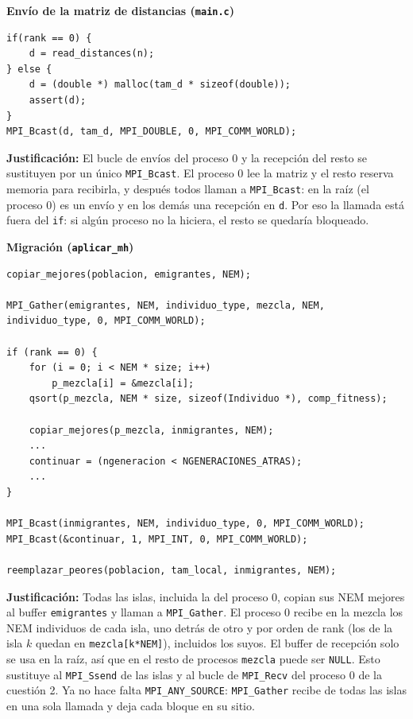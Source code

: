 \documentclass[12pt]{article}
\begin{document}
\begin{enumerate}
\medskip
\noindent\textbf{Envío de la matriz de distancias (\texttt{main.c})}\par
\smallskip

\begin{lstlisting}[style=EstiloC]
if(rank == 0) {
	d = read_distances(n);
} else {
	d = (double *) malloc(tam_d * sizeof(double));
	assert(d);
}
MPI_Bcast(d, tam_d, MPI_DOUBLE, 0, MPI_COMM_WORLD);
\end{lstlisting}

\textbf{Justificación:} El bucle de envíos del proceso 0 y la recepción del resto se sustituyen por un único \texttt{MPI\_Bcast}. El proceso 0 lee la matriz y el resto reserva memoria para recibirla, y después todos llaman a \texttt{MPI\_Bcast}: en la raíz (el proceso 0) es un envío y en los demás una recepción en \texttt{d}. Por eso la llamada está fuera del \texttt{if}: si algún proceso no la hiciera, el resto se quedaría bloqueado.

\vspace{0.5cm}


\medskip
\noindent\textbf{Migración (\texttt{aplicar\_mh})}\par
\smallskip

\begin{lstlisting}[style=EstiloC]
copiar_mejores(poblacion, emigrantes, NEM);

MPI_Gather(emigrantes, NEM, individuo_type, mezcla, NEM, individuo_type, 0, MPI_COMM_WORLD);

if (rank == 0) {
	for (i = 0; i < NEM * size; i++)
		p_mezcla[i] = &mezcla[i];
	qsort(p_mezcla, NEM * size, sizeof(Individuo *), comp_fitness);

	copiar_mejores(p_mezcla, inmigrantes, NEM);
	...
	continuar = (ngeneracion < NGENERACIONES_ATRAS);
	...
}

MPI_Bcast(inmigrantes, NEM, individuo_type, 0, MPI_COMM_WORLD);
MPI_Bcast(&continuar, 1, MPI_INT, 0, MPI_COMM_WORLD);

reemplazar_peores(poblacion, tam_local, inmigrantes, NEM);
\end{lstlisting}

\textbf{Justificación:} Todas las islas, incluida la del proceso 0, copian sus NEM mejores al buffer \texttt{emigrantes} y llaman a \texttt{MPI\_Gather}. El proceso 0 recibe en la mezcla los NEM individuos de cada isla, uno detrás de otro y por orden de rank (los de la isla $k$ quedan en \texttt{mezcla[k*NEM]}), incluidos los suyos. El buffer de recepción solo se usa en la raíz, así que en el resto de procesos \texttt{mezcla} puede ser \texttt{NULL}. Esto sustituye al \texttt{MPI\_Ssend} de las islas y al bucle de \texttt{MPI\_Recv} del proceso 0 de la cuestión 2. Ya no hace falta \texttt{MPI\_ANY\_SOURCE}: \texttt{MPI\_Gather} recibe de todas las islas en una sola llamada y deja cada bloque en su sitio.


\end{enumerate}
\end{document}
